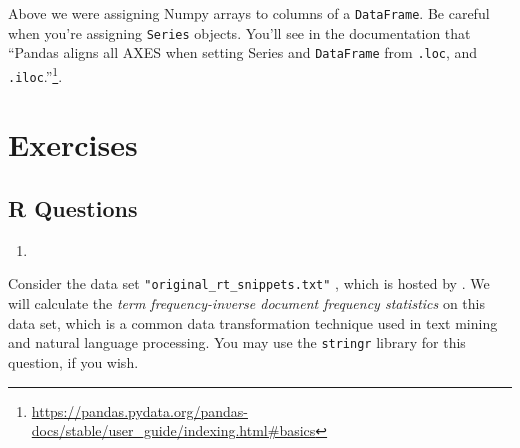 \documentclass[
  12pt,
  krantz2]{krantz}
\providecommand{\tightlist}{%
  \setlength{\itemsep}{0pt}\setlength{\parskip}{0pt}}
\renewcommand{\href}[2]{#2\footnote{\url{#1}}}
\begin{document}
\begin{rmd-caution}
Above we were assigning Numpy arrays to columns of a \texttt{DataFrame}. Be careful when you're assigning \texttt{Series} objects. You'll see in the documentation that \href{https://pandas.pydata.org/pandas-docs/stable/user_guide/indexing.html\#basics}{``Pandas aligns all AXES when setting Series and \texttt{DataFrame} from \texttt{.loc}, and \texttt{.iloc}.''}.

\end{rmd-caution}

\hypertarget{exercises-6}{%
\section{Exercises}\label{exercises-6}}

\hypertarget{r-questions-6}{%
\subsection{R Questions}\label{r-questions-6}}

\begin{enumerate}
\def\labelenumi{\arabic{enumi}.}
\tightlist
\item
\end{enumerate}

Consider the data set \texttt{"original\_rt\_snippets.txt"} \citep{SocherEtAl2013:RNTN}, which is hosted by \citep{uci_data}. We will calculate the \emph{term frequency-inverse document frequency statistics} \citep{Jones72astatistical} on this data set, which is a common data transformation technique used in text mining and natural language processing. You may use the \texttt{stringr} library for this question, if you wish.
\end{document}
